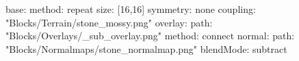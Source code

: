 base:
  method: repeat
  size: [16,16]
  symmetry: none
  coupling: "Blocks/Terrain/stone_mossy.png"
overlay:
  path: "Blocks/Overlays/_sub_overlay.png"
  method: connect
normal:
  path: "Blocks/Normalmaps/stone_normalmap.png"
blendMode: subtract